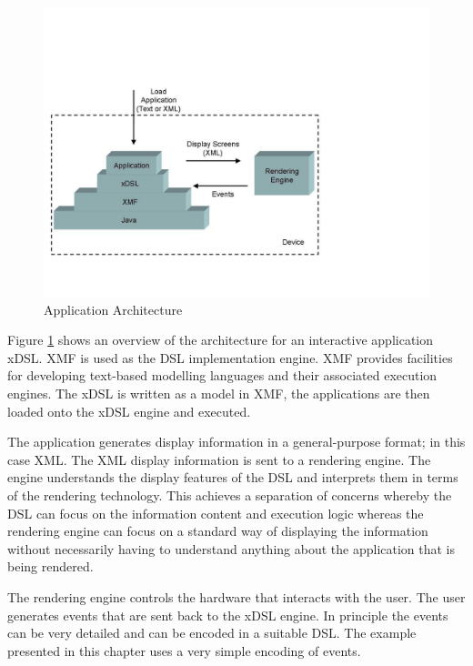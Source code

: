 %
\begin{figure}
\begin{center}
\includegraphics[scale=0.5]{CaseStudy4/figures/Architecture.pdf}

\caption{Application Architecture\label{fig:Application-Architecture}}
\end{center}
\end{figure}


Figure \ref{fig:Application-Architecture} shows an overview of the
architecture for an interactive application xDSL. XMF is used as the
DSL implementation engine. XMF provides facilities for developing
text-based modelling languages and their associated execution engines.
The xDSL is written as a model in XMF, the applications are then loaded
onto the xDSL engine and executed.

The application generates display information in a general-purpose
format; in this case XML. The XML display information is sent to a
rendering engine. The engine understands the display features of the
DSL and interprets them in terms of the rendering technology. This
achieves a separation of concerns whereby the DSL can focus on the
information content and execution logic whereas the rendering engine
can focus on a standard way of displaying the information without
necessarily having to understand anything about the application that
is being rendered.

The rendering engine controls the hardware that interacts with the
user. The user generates events that are sent back to the xDSL engine.
In principle the events can be very detailed and can be encoded in
a suitable DSL. The example presented in this chapter uses a very simple
encoding of events.

